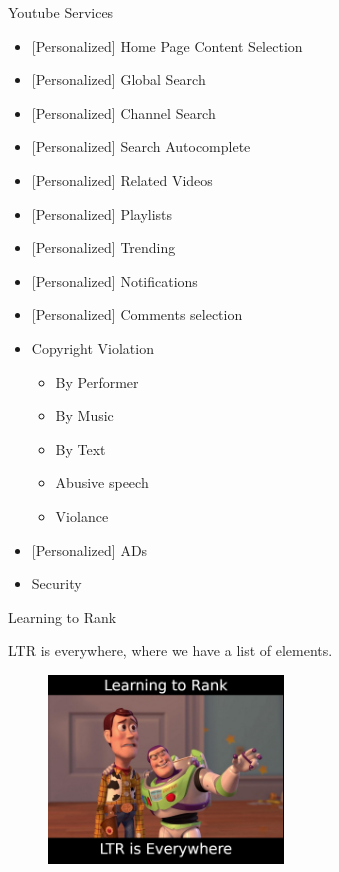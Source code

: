 \documentclass[10pt]{beamer}
\begin{document}
\begin{frame}{Youtube Services}
    \begin{itemize}
        \item {[Personalized]} Home Page Content Selection
        \item {[Personalized]} Global Search
        \item {[Personalized]} Channel Search
        \item {[Personalized]} Search Autocomplete
        \item {[Personalized]} Related Videos
        \item {[Personalized]} Playlists
        \item {[Personalized]} Trending
        \item {[Personalized]} Notifications
        \item {[Personalized]} Comments selection 
        \item Copyright Violation
            \begin{itemize}
                \item By Performer
                \item By Music
                \item By Text
                \item Abusive speech
                \item Violance
            \end{itemize}
        \item {[Personalized]} ADs
        \item Security
    \end{itemize}
\end{frame}

\begin{frame}{Learning to Rank}
        \begin{center}
LTR is everywhere, where we have a list of elements.
    \end{center}
\begin{figure}
    \includegraphics[height=5cm]{images/learning-to-rank-everywhere.jpg}
\end{figure}
\end{frame}
\end{document}
